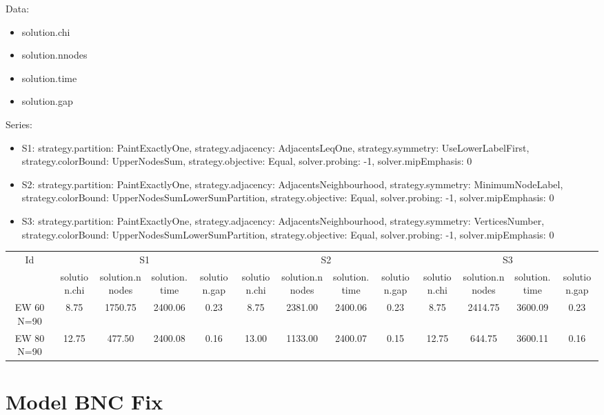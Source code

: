 \documentclass[landscape, 12pt]{report}
\begin{document}
Data:
\begin{itemize}
\item solution.chi
\item solution.nnodes
\item solution.time
\item solution.gap
\end{itemize}
Series:
\begin{itemize}
\item S1: strategy.partition: PaintExactlyOne, strategy.adjacency: AdjacentsLeqOne, strategy.symmetry: UseLowerLabelFirst, strategy.colorBound: UpperNodesSum, strategy.objective: Equal, solver.probing: -1, solver.mipEmphasis: 0
\item S2: strategy.partition: PaintExactlyOne, strategy.adjacency: AdjacentsNeighbourhood, strategy.symmetry: MinimumNodeLabel, strategy.colorBound: UpperNodesSumLowerSumPartition, strategy.objective: Equal, solver.probing: -1, solver.mipEmphasis: 0
\item S3: strategy.partition: PaintExactlyOne, strategy.adjacency: AdjacentsNeighbourhood, strategy.symmetry: VerticesNumber, strategy.colorBound: UpperNodesSumLowerSumPartition, strategy.objective: Equal, solver.probing: -1, solver.mipEmphasis: 0
\end{itemize}
\begin{tabular}{|c|cccc|cccc|cccc|}
\hline
\multicolumn{1}{|c|}{Id} & \multicolumn{4}{|c|}{S1} & \multicolumn{4}{|c|}{S2} & \multicolumn{4}{|c|}{S3}
\\
 & solution.chi & solution.nnodes & solution.time & solution.gap & solution.chi & solution.nnodes & solution.time & solution.gap & solution.chi & solution.nnodes & solution.time & solution.gap
\\
\hline
EW 60 N=90 & 8.75 & 1750.75 & 2400.06 & 0.23 & 8.75 & 2381.00 & 2400.06 & 0.23 & 8.75 & 2414.75 & 3600.09 & 0.23
\\
EW 80 N=90 & 12.75 & 477.50 & 2400.08 & 0.16 & 13.00 & 1133.00 & 2400.07 & 0.15 & 12.75 & 644.75 & 3600.11 & 0.16
\\
\hline 
 \end{tabular}

	
	\clearpage
	
	\section{Model BNC Fix}
	
\end{document}
